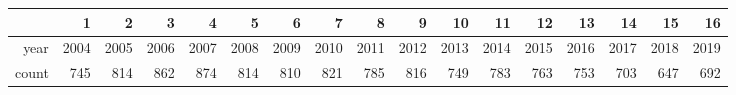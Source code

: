 \begin{table}[ht]
\centering
\begin{tabular}{rrrrrrrrrrrrrrrrr}
  \hline
 & 1 & 2 & 3 & 4 & 5 & 6 & 7 & 8 & 9 & 10 & 11 & 12 & 13 & 14 & 15 & 16 \\ 
  \hline
year & 2004 & 2005 & 2006 & 2007 & 2008 & 2009 & 2010 & 2011 & 2012 & 2013 & 2014 & 2015 & 2016 & 2017 & 2018 & 2019 \\ 
  count & 745 & 814 & 862 & 874 & 814 & 810 & 821 & 785 & 816 & 749 & 783 & 763 & 753 & 703 & 647 & 692 \\ 
   \hline
\end{tabular}
\end{table}

